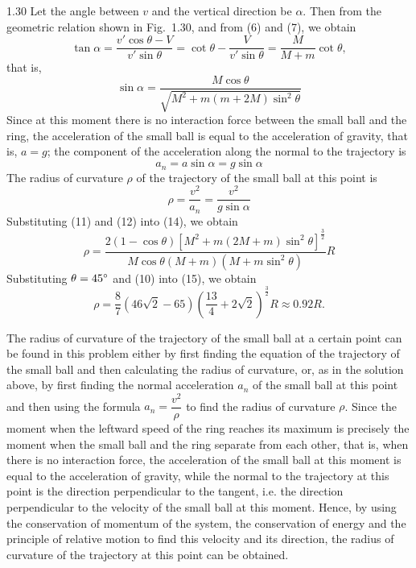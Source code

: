 \begin{solution}{1.30}
Let the angle between $v$ and the vertical direction be $\alpha$. Then from the geometric relation shown in Fig.~1.30, and from (6) and (7), we obtain
\[
\tan\alpha=\frac{v'\cos\theta-V}{v'\sin\theta}=\cot\theta-\frac{V}{v'\sin\theta}=\frac{M}{M+m}\cot\theta,
\]
that is,
\begin{equation}
\sin\alpha=\frac{M\cos\theta}{\sqrt{M^2+m(m+2M)\sin^2\theta}} \tag{12}
\end{equation}
Since at this moment there is no interaction force between the small ball and the ring, the acceleration of the small ball is equal to the acceleration of gravity, that is, $a=g$; the component of the acceleration along the normal to the trajectory is
\begin{equation}
a_n=a\sin\alpha=g\sin\alpha \tag{13}
\end{equation}
The radius of curvature $\rho$ of the trajectory of the small ball at this point is
\begin{equation}
\rho=\frac{v^2}{a_n}=\frac{v^2}{g\sin\alpha} \tag{14}
\end{equation}
Substituting (11) and (12) into (14), we obtain
\begin{equation}
\rho=\frac{2(1-\cos\theta)\left[M^2+m(2M+m)\sin^2\theta\right]^{\frac{3}{2}}}{M\cos\theta(M+m)(M+m\sin^2\theta)}R \tag{15}
\end{equation}
Substituting $\theta=45^{\circ}$ and (10) into (15), we obtain
\[
\rho=\frac{8}{7}\left(46\sqrt{2}-65\right)\left(\frac{13}{4}+2\sqrt{2}\right)^{\frac{3}{2}}R\approx 0.92R.
\]

\begin{commentary}
The radius of curvature of the trajectory of the small ball at a certain point can be found in this problem either by first finding the equation of the trajectory of the small ball and then calculating the radius of curvature, or, as in the solution above, by first finding the normal acceleration $a_n$ of the small ball at this point and then using the formula $a_n=\dfrac{v^2}{\rho}$ to find the radius of curvature $\rho$. Since the moment when the leftward speed of the ring reaches its maximum is precisely the moment when the small ball and the ring separate from each other, that is, when there is no interaction force, the acceleration of the small ball at this moment is equal to the acceleration of gravity, while the normal to the trajectory at this point is the direction perpendicular to the tangent, i.e. the direction perpendicular to the velocity of the small ball at this moment. Hence, by using the conservation of momentum of the system, the conservation of energy and the principle of relative motion to find this velocity and its direction, the radius of curvature of the trajectory at this point can be obtained.
\end{commentary}

\end{solution}

